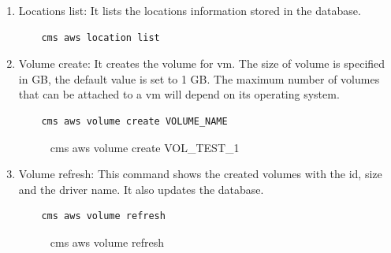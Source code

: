 \documentclass[9pt,twocolumn,twoside]{../../styles/osajnl}
\begin{document}
\begin{enumerate}
	\item Locations list: It lists the locations information stored in the database.
	
	\begin{verbatim}
	cms aws location list
	\end{verbatim}
	
    \item Volume create: It creates the volume for vm. The size of volume is specified in GB, the default value is set to 1 GB. The maximum number of volumes that can be attached to a vm will depend on its operating system.
    
    \begin{verbatim}
    cms aws volume create VOLUME_NAME
    \end{verbatim}
    
    \begin{figure}[h!]
    	\centering
    	\caption{cms aws volume create VOL\_TEST\_1}
    	\label{fig:createvolume}
    \end{figure}
     
    \item Volume refresh: This command shows the created volumes with the id, size and the driver name. It also updates the database.
    
    \begin{verbatim}
    cms aws volume refresh
    \end{verbatim}
    
    \begin{figure}[h!]
    	\centering
    	\caption{cms aws volume refresh}
    	\label{fig:volumelist}
    \end{figure}
    

\end{enumerate}
\end{document}
